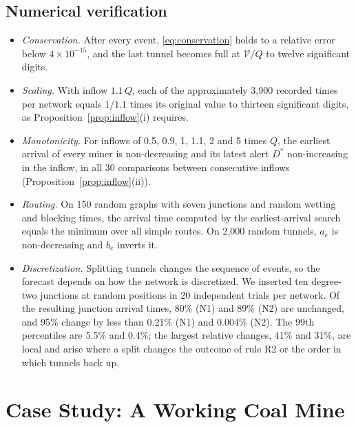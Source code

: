 \documentclass[11pt,a4paper]{article}
\theoremstyle{plain}
\theoremstyle{definition}
\theoremstyle{remark}
\begin{document}
\subsection{Numerical verification}\label{sec:verification}
\begin{itemize}[leftmargin=1.5em, itemsep=2pt, topsep=2pt]
  \item \emph{Conservation.} After every event, \eqref{eq:conservation} holds to a relative error below $4\times10^{-15}$, and the last tunnel becomes full at $\mathcal{V}/Q$ to twelve significant digits.
  \item \emph{Scaling.} With inflow $1.1\,Q$, each of the approximately 3{,}900 recorded times per network equals $1/1.1$ times its original value to thirteen significant digits, as Proposition~\ref{prop:inflow}(i) requires.
  \item \emph{Monotonicity.} For inflows of 0.5, 0.9, 1, 1.1, 2 and 5 times $Q$, the earliest arrival of every miner is non-decreasing and its latest alert $D^*$ non-increasing in the inflow, in all 30 comparisons between consecutive inflows (Proposition~\ref{prop:inflow}(ii)).
  \item \emph{Routing.} On 150 random graphs with seven junctions and random wetting and blocking times, the arrival time computed by the earliest-arrival search equals the minimum over all simple routes. On 2{,}000 random tunnels, $a_e$ is non-decreasing and $b_e$ inverts it.
  \item \emph{Discretization.} Splitting tunnels changes the sequence of events, so the forecast depends on how the network is discretized. We inserted ten degree-two junctions at random positions in 20 independent trials per network. Of the resulting junction arrival times, 80\% (N1) and 89\% (N2) are unchanged, and 95\% change by less than 0.21\% (N1) and 0.004\% (N2). The 99th percentiles are 5.5\% and 0.4\%; the largest relative changes, 41\% and 31\%, are local and arise where a split changes the outcome of rule R2 or the order in which tunnels back up.
\end{itemize}

\section{Case Study: A Working Coal Mine}\label{sec:case}
\end{document}
